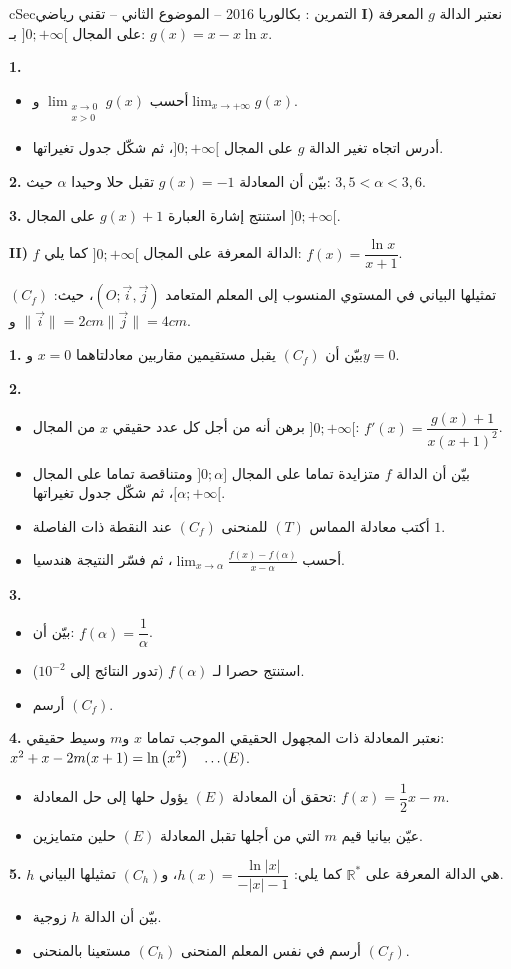 \documentclass[12pt,a4paper]{article}
\newenvironment{BOX}[2]{\begin{otherlanguage}{english}\begin{arbox}{#1}{#2}}{\end{arbox}\end{otherlanguage}}
\newcounter{exo}
\newenvironment{tamrin}[1]{\stepcounter{exo}\begin{BOX}{cSec}{التمرين \theexo: #1}}{\end{BOX}}
\renewcommand{\dots}{\mathinner{\ldotp\ldotp\ldotp}}
\newcommand{\R}{\mathbb{R}}
\newenvironment{sq}{\begin{itemize}[leftmargin=2.4em,itemsep=3pt]}{\end{itemize}}
\newcommand{\qa}{\item[(أ)]}\newcommand{\qb}{\item[(ب)]}\newcommand{\qc}{\item[(جـ)]}\newcommand{\qd}{\item[(د)]}\newcommand{\qe}{\item[(هـ)]}
\newcommand{\QQ}[1]{\par\smallskip\textbf{#1.} }
\begin{document}
\begin{tamrin}{بكالوريا 2016 -- الموضوع الثاني -- تقني رياضي}
\textbf{I)} نعتبر الدالة $g$ المعرفة على المجال $]0;+\infty[$ بـ: $g(x)=x-x\ln x$.
\QQ{1}
\begin{sq}
\qa أحسب $\displaystyle\lim_{\substack{x\to0\\x>0}}g(x)$ و$\displaystyle\lim_{x\to+\infty}g(x)$.
\qb أدرس اتجاه تغير الدالة $g$ على المجال $]0;+\infty[$، ثم شكّل جدول تغيراتها.
\end{sq}
\QQ{2} بيّن أن المعادلة $g(x)=-1$ تقبل حلا وحيدا $\alpha$ حيث: $3{,}5<\alpha<3{,}6$.
\QQ{3} استنتج إشارة العبارة $g(x)+1$ على المجال $]0;+\infty[$.

\textbf{II)} $f$ الدالة المعرفة على المجال $]0;+\infty[$ كما يلي: $f(x)=\dfrac{\ln x}{x+1}$.

$(C_f)$ تمثيلها البياني في المستوي المنسوب إلى المعلم المتعامد $(O;\vec{i},\vec{j})$، حيث: $\|\vec{i}\|=2cm$ و$\|\vec{j}\|=4cm$.
\QQ{1} بيّن أن $(C_f)$ يقبل مستقيمين مقاربين معادلتاهما $x=0$ و$y=0$.
\QQ{2}
\begin{sq}
\qa برهن أنه من أجل كل عدد حقيقي $x$ من المجال $]0;+\infty[$: $f'(x)=\dfrac{g(x)+1}{x(x+1)^2}$.
\qb بيّن أن الدالة $f$ متزايدة تماما على المجال $]0;\alpha]$ ومتناقصة تماما على المجال $[\alpha;+\infty[$، ثم شكّل جدول تغيراتها.
\qc أكتب معادلة المماس $(T)$ للمنحنى $(C_f)$ عند النقطة ذات الفاصلة $1$.
\qd أحسب $\displaystyle\lim_{x\to\alpha}\frac{f(x)-f(\alpha)}{x-\alpha}$، ثم فسّر النتيجة هندسيا.
\end{sq}
\QQ{3}
\begin{sq}
\qa بيّن أن: $f(\alpha)=\dfrac{1}{\alpha}$.
\qb استنتج حصرا لـ $f(\alpha)$ (تدور النتائج إلى $10^{-2}$).
\qc أرسم $(C_f)$.
\end{sq}
\QQ{4} نعتبر المعادلة ذات المجهول الحقيقي الموجب تماما $x$ و$m$ وسيط حقيقي: $x^2+x-2m(x+1)=\ln\left(x^2\right)\quad\dots(E)$.
\begin{sq}
\qa تحقق أن المعادلة $(E)$ يؤول حلها إلى حل المعادلة: $f(x)=\dfrac12x-m$.
\qb عيّن بيانيا قيم $m$ التي من أجلها تقبل المعادلة $(E)$ حلين متمايزين.
\end{sq}
\QQ{5} $h$ هي الدالة المعرفة على $\R^*$ كما يلي: $h(x)=\dfrac{\ln|x|}{-|x|-1}$، و$(C_h)$ تمثيلها البياني.
\begin{sq}
\qa بيّن أن الدالة $h$ زوجية.
\qb أرسم في نفس المعلم المنحنى $(C_h)$ مستعينا بالمنحنى $(C_f)$.
\end{sq}
\end{tamrin}
\end{document}
